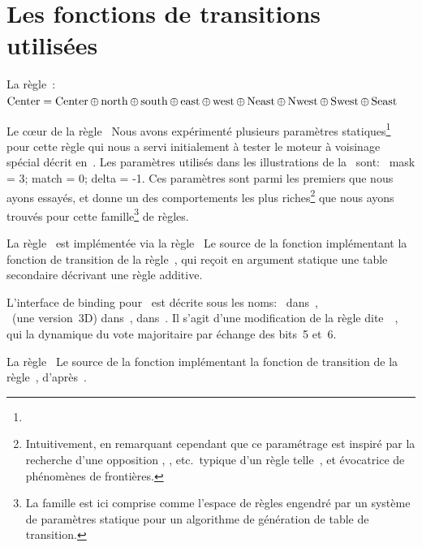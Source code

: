 \chapter{Les fonctions de transitions utilisées}

\label{rule-xor9}%
La règle~:\\
$\operatorname{Center}= \operatorname{Center} \oplus \operatorname{north} \oplus \operatorname{south} \oplus \operatorname{east} \oplus \operatorname{west} \oplus\\
 \operatorname{Neast} \oplus \operatorname{Nwest} \oplus \operatorname{Swest} \oplus \operatorname{Seast}$

%
{}%
{Le cœur de la règle~}%
{\label{rule-qmean}%
  Nous avons expérimenté plusieurs paramètres statiques\footnote{%
    } %
  pour cette règle qui nous a servi initialement à tester le moteur à
  voisinage spécial décrit en~. %
  Les paramètres utilisés dans les illustrations de
  la~ sont:~%
  mask = 3; match = 0; delta = -1. %
  Ces paramètres sont parmi les premiers que nous ayons essayés, et
  donne un des comportements les plus riches\footnote{%
    Intuitivement, en remarquant cependant que
    ce para\-mé\-trage est ins\-piré par la recherche d'une opposition
    ,
    , etc.\  typique d'un règle
    telle~, et évocatrice de phénomènes de frontières.} %
  que nous ayons trouvés pour cette famille\footnote{%
    La famille est ici comprise comme l'espace de règles engendré par
    un système de paramètres statique pour un algorithme de génération de
    table de transition.} %
  de règles.}

%
{}%
{La règle~ est implémentée via la règle~}%
{\label{rule-anneal}%
  Le source de la fonction  implémentant la fonction de
  transition de la règle~, qui reçoit en argument statique
  une table secondaire décrivant une règle additive. %
  }%

%
{}%
{L'interface de binding  pour~}%
{ est décrite sous les noms:~%
     dans~\cite{Vichniac86}, \\%
    ~(une version~3D) dans~\cite{Pickover92b}, %
     dans~\cite{Toffoli87}. %
    Il s'agit d'une modification de la règle
    dite~~\cite{Toffoli87}, qui
     la dynamique du vote majoritaire par échange des
    bits~5 et~6.}

%
{}%
{La règle~}%
{\label{rule-tube-worm}%
  Le source de la fonction  implémentant la fonction de
  transition de la règle~,
  d'après~\cite{Toffoli87}.}


